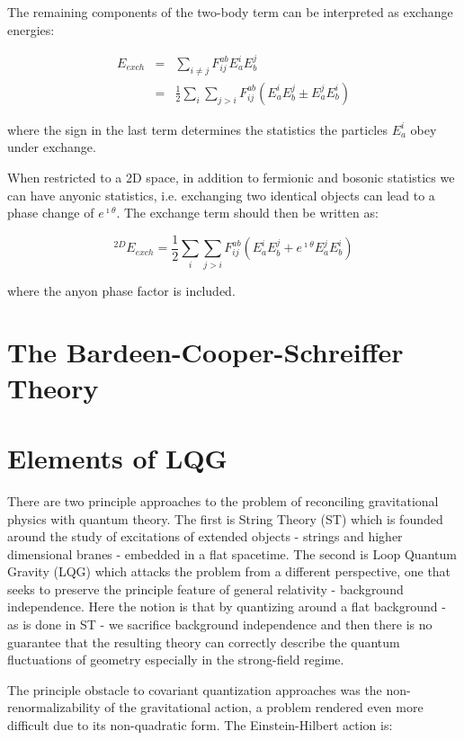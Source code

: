 \documentclass[11pt,english,rmp]{revtex4}
\begin{document}
The remaining components of the two-body term can be interpreted as
exchange energies:

\begin{eqnarray}
E_{exch} & = & \sum_{i\neq j}F_{ij}^{ab}E_{a}^{i}E_{b}^{j}\label{eqn:exchTerm}\\
 & = & \frac{1}{2}\sum_{i}\sum_{j>i}F_{ij}^{ab}\left(E_{a}^{i}E_{b}^{j}\pm E_{a}^{j}E_{b}^{i}\right)\end{eqnarray}


where the sign in the last term determines the statistics the particles
$E_{a}^{i}$ obey under exchange.

When restricted to a 2D space, in addition to fermionic and bosonic
statistics we can have anyonic statistics, i.e. exchanging two identical
objects can lead to a phase change of $e^{\imath\theta}$. The exchange
term should then be written as:

\[
^{2D}E_{exch}=\frac{1}{2}\sum_{i}\sum_{j>i}F_{ij}^{ab}\left(E_{a}^{i}E_{b}^{j}+e^{\imath\theta}E_{a}^{j}E_{b}^{i}\right)\]

where the anyon phase factor is included.

\section{The Bardeen-Cooper-Schreiffer Theory}



\section{Elements of LQG}

There are two principle approaches to the problem of reconciling gravitational
physics with quantum theory. The first is String Theory (ST) which
is founded around the study of excitations of extended objects - strings
and higher dimensional branes - embedded in a flat spacetime. The
second is Loop Quantum Gravity (LQG) which attacks the problem from
a different perspective, one that seeks to preserve the principle
feature of general relativity - background independence. Here the
notion is that by quantizing around a flat background - as is done
in ST - we sacrifice background independence and then there is no
guarantee that the resulting theory can correctly describe the quantum
fluctuations of geometry especially in the strong-field regime.

The principle obstacle to covariant quantization approaches was the
non-renormalizability of the gravitational action, a problem rendered
even more difficult due to its non-quadratic form. The Einstein-Hilbert
action is:
\end{document}
